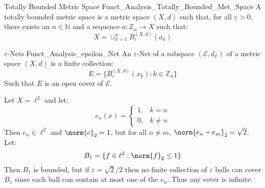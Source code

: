 \documentclass[crop=false,class=book,oneside]{standalone}                      %
\begin{document}
            \begin{ldefinition}{Totally Bounded Metric Space}
                  {Funct_Analysis_Totally_Bounded_Met_Space}
                A totally bounded metric space is a metric
                space $(X,d)$ such that, for all $\varepsilon>0$,
                there exists an $n\in\mathbb{N}$ and a sequence
                $a:\mathbb{Z}_{n}\rightarrow{X}$ such that:
                \begin{equation}
                    X=\cup_{k=1}^{n}B_{\varepsilon}^{(X,d)}(a_{k})
                \end{equation}
            \end{ldefinition}
            \begin{ldefinition}{$\varepsilon\textrm{-Nets}$}
                  {Funct_Analysis_epsilon_Net}
                An $\varepsilon\textrm{-Net}$ of a subspace
                $(\mathcal{E},d_{\mathcal{E}})$ of a
                metric space $(X,d)$ is a finite collection:
                \begin{equation}
                    E=\{B_{\varepsilon}^{(X,d)}(x_{k}):
                        k\in\mathbb{Z}_{n}\}
                \end{equation}
                Such that $E$ is an open cover of $\mathcal{E}$.
            \end{ldefinition}
            \begin{lexample}
                Let $X=\ell^{2}$ and let:
                \begin{equation}
                    e_{n}(x)=
                    \begin{cases}
                        1,&k=n\\
                        0,&k\ne{n}
                    \end{cases}
                \end{equation}
                Then $e_{n}\in\ell^{2}$ and $\norm{e}_{2}=1$,
                but for all $n\ne{m}$,
                $\norm{e_{n}-e_{m}}_{2}=\sqrt{2}$. Let:
                \begin{equation}
                    B_{1}=\{f\in\ell^{2}:\norm{f}_{2}\leq{1}\}
                \end{equation}
                Then $B_{1}$ is bounded, but if
                $\varepsilon=\sqrt{2}/2$ then no finite collection
                of $\varepsilon$ balls can cover $B_{1}$ since
                each ball can contain at most one of the
                $e_{n}$. Thus any cover is infinite.
            \end{lexample}
\end{document}
